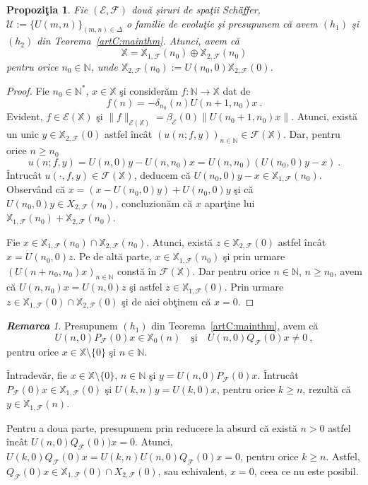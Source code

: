 \documentclass[ a4paper, 12pt]{report}
\newcommand{\E}{\mathcal{E}}
\newcommand{\F}{\mathcal{F}}
\newcommand{\N}{\mathbb{N}}
\newcommand{\X}{\mathbb{X}}
\newtheorem{prop}[theorem]{\bf Propozi\c tia }
\theoremstyle{definition}
\theoremstyle{remark}
\newtheorem{remarc}{\bf Remarca}[section]
\numberwithin{equation}{section}
\begin{document}
\begin{prop}
Fie $(\E,\F)$ dou\u a \c siruri de spa\c tii Sch\"{a}ffer, $\mathcal{U}:=\{U(m,n)\}_{(m,n)\in\Delta}$ o familie de evolu\c tie \c si presupunem c\u a avem  $(h_1)$ \c si  $(h_2)$ din Teorema~\ref{artC:mainthm}. Atunci, avem c\u a
$$\X= \X_{1,\F}(n_0)\oplus \X_{2,\F}(n_0) $$ pentru orice $n_0\in\N$, unde $\X_{2,\F}(n_0):=U(n_0,0)\X_{2,\F}(0)$.
\end{prop}
\begin{proof}
Fie $n_0\in\N^{*}$, $x\in\X$ \c si consider\u am  $f:\N\to\X$ dat de
$$ f(n)=-\delta_{n_0}(n)U(n+1,n_0)x \ .$$
Evident, $f\in\E(\X)$ \c si $\|f\|_{\E(\X)}=\beta_{\E}(0)\|U(n_0+1,n_0)x\|$.
Atunci, exist\u a un unic  $y\in\X_{2,\F}(0)$ astfel \^inc\^at $(u(n;f,y))_{n\in\N}\in\F(\X)$.
Dar, pentru orice $n\geq n_0$
$$u(n;f,y)=U(n,0)y - U(n,n_0)x = U(n,n_0)\left( U(n_0,0)y- x\right)\ .$$
\^Intruc\^at $u(\cdot,f,y)\in\F(\X)$, deducem c\u a $U(n_0,0)y-x \in\X_{1,\F}(n_0)$. Observ\^and c\u a
$x=(x-U(n_0,0)y) + U(n_0,0)y$ \c si c\u a  $U(n_0,0)y\in X_{2,\F}(n_0)$, concluzion\u am c\u a
$x$ apar\c tine lui $\X_{1,\F}(n_0) + \X_{2,\F}(n_0)$.

Fie $x\in \X_{1,\F}(n_0) \cap \X_{2,\F}(n_0)$. Atunci, exist\u a  $z\in \X_{2,\F}(0)$ astfel \^inc\^at $x=U(n_0,0)z$. Pe de alt\u a parte, $x\in \X_{1,\F}(n_0)$ \c si prin urmare $(U(n+n_0,n_0)x)_{n\in\N}$ const\u a \^in $\F(\X)$. Dar pentru orice $n\in\N$, $n\geq n_0$, avem c\u a
$U(n,n_0)x= U(n,0)z$ \c si astfel  $z\in\X_{1,\F}(0)$. Prin urmare $z\in
\X_{1,\F}(0)\cap \X_{2,\F}(0)$ \c si de aici ob\c tinem c\u a $x=0$.

\end{proof}


\begin{remarc}
\label{artC:rem4mainthm}
Presupunem $(h_1)$ din Teorema~\ref{artC:mainthm}, avem c\u a
$$U(n,0)P_{\F}(0)x\in \X_0(n)\quad \mbox{\c si}\quad U(n,0)Q_{\F}(0)x\neq0\ ,$$
pentru orice $x\in\X\setminus\{0\}$ \c si $n\in\N$.

\^Intradev\u ar, fie $x\in \X\setminus\{0\}$, $n\in\N$ \c si $y=U(n,0)P_{\F}(0)x$.
\^Intruc\^at $P_{\F}(0)x\in\X_{1,\F}(0)$ \c si $U(k,n)y=U(k,0)x$, pentru orice $k\geq n$, rezult\u a c\u a $y\in \X_{1,\F}(n)$.

Pentru a doua parte, presupunem prin reducere la absurd c\u a exist\u a $n>0$ astfel \^inc\^at $U(n,0)Q_{\F}(0))x=0$. Atunci,
$U(k,0)Q_{\F}(0)x = U(k,n)U(n,0)Q_{\F}(0)x=0$, pentru orice $k\geq n$. Astfel,
$Q_{\F}(0)x\in\X_{1,\F}(0)\cap X_{2,\F}(0)$, sau echivalent, $x=0$, ceea ce nu este posibil.
\end{remarc}
\end{document}
